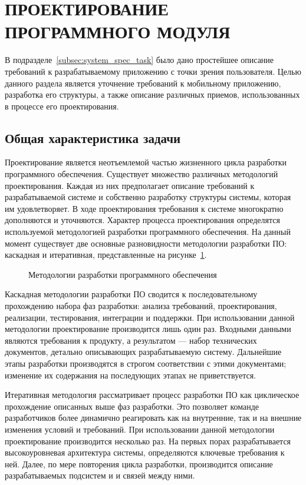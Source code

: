 \section[Проектирование программного модуля]{%
  ПРОЕКТИРОВАНИЕ ПРОГРАММНОГО МОДУЛЯ
}\label{sec:design}

В подразделе~\ref{subsec:system_spec_task} было дано простейшее
описание требований к разрабатываемому приложению с точки зрения пользователя.
Целью данного раздела является уточнение требований к мобильному приложению,
разработка его структуры, а также описание различных приемов,
использованных в процессе его проектирования.

\subsection{Общая характеристика задачи}

Проектирование является неотъемлемой частью жизненного цикла
разработки программного обеспечения.
Существует множество различных методологий проектирования.
Каждая из них предполагает описание требований к разрабатываемой системе
и собственно разработку структуры системы, которая им удовлетворяет.
В ходе проектирования требования к системе многократно дополняются и уточняются.
Характер процесса проектирования определятся используемой
методологией разработки программного обеспечения.
На данный момент существует две основные разновидности методологии разработки ПО:
каскадная и итеративная, представленные на рисунке~\ref{fig:design_methods}.

\begin{figure}[h!]
  \centering
  \caption{Методологии разработки программного обеспечения}
  \label{fig:design_methods}
\end{figure}

Каскадная методологии разработки ПО сводится к последовательному
прохождению набора фаз разработки:
анализа требований, проектирования, реализации, тестирования, интеграции и поддержки.
При использовании данной методологии проектирование производится
лишь один раз. Входными данными являются требования к продукту,
а результатом --- набор технических документов, детально описывающих
разрабатываемую систему.
Дальнейшие этапы разработки производятся в строгом соответствии с этими документами;
изменение их содержания на последующих этапах не приветствуется.

Итеративная методология рассматривает процесс разработки ПО как
циклическое прохождение описанных выше фаз разработки.
Это позволяет команде разработчиков более динамично реагировать
как на внутренние, так и на внешние изменения условий и требований.
При использовании данной методологии проектирование производится несколько раз.
На первых порах разрабатывается высокоуровневая архитектура системы,
определяются ключевые требования к ней. Далее, по мере повторения цикла
разработки, производится описание разрабатываемых подсистем и и связей между ними.


